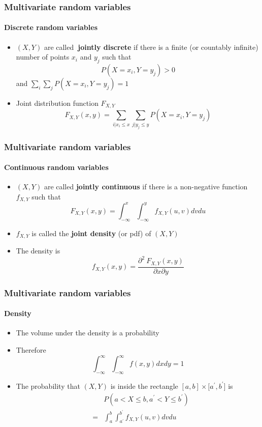 \documentclass[notes=show]{beamer}
\begin{document}
\begin{frame}\frametitle{Multivariate random variables}\framesubtitle{Discrete random variables}
\begin{itemize}
    \item $(X,Y)$ are called\textbf{\ jointly discrete} if there is a finite\newline
        (or countably infinite) number of points $x_{i}$ and $y_{j}$ such that    \begin{equation*}
            P(X=x_{i},Y=y_{j})>0
        \end{equation*}
        and $\sum_{i}\sum_{j}P(X=x_{i},Y=y_{j})=1$
    \item Joint distribution function $F_{X,Y}$
    \begin{equation*}
        F_{X,Y}(x,y)=\sum_{i|x_{i}\leq x}\sum_{j|y_{j}\leq y}P(X=x_{i},Y=y_{j})
    \end{equation*}
\end{itemize}
\end{frame}



\begin{frame}\frametitle{Multivariate random variables}\framesubtitle{Continuous random variables}
\begin{itemize}
    \item $(X,Y)$ are called \textbf{jointly continuous }if there is a non-negative function $f_{X,Y}$ such that
        \begin{equation*}
            F_{X,Y}(x,y)=\int_{-\infty }^{x}\int_{-\infty }^{y}f_{X,Y}(u,v)dvdu
        \end{equation*}
    \item $f_{X,Y}$ is called the \textbf{joint density} (or pdf) of $(X,Y)$
    \item The density is
    \begin{equation*}
        f_{X,Y}(x,y)=\frac{\partial ^{2}\ F_{X,Y}(x,y)}{\partial x\partial y}
    \end{equation*}
\end{itemize}
\end{frame}


\begin{frame}\frametitle{Multivariate random variables}\framesubtitle{Density}
\begin{itemize}
    \item The volume under the density is a probability
    \item Therefore
        \begin{equation*}
            \int_{-\infty }^{\infty }\int_{-\infty }^{\infty }f\left( x,y\right) dxdy=1
        \end{equation*}
    \item The probability that $(X,Y)$ is inside the rectangle $[a,b]\times \lbrack a^{\prime },b^{\prime }]$ is
    \begin{eqnarray*}
        &&P\left( a<X\leq b,a^{\prime }<Y\leq b^{\prime }\right) \\
        &=&\int_{a}^{b}\int_{a^{\prime }}^{b^{\prime }}f_{X,Y}(u,v)dvdu
    \end{eqnarray*}
\end{itemize}
\end{frame}
\end{document}
